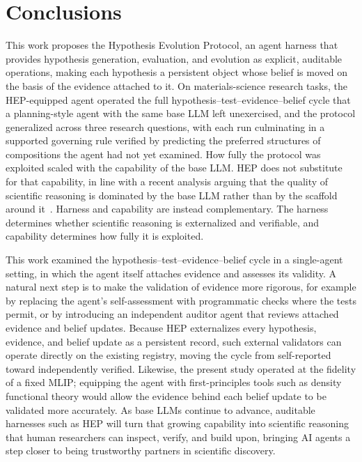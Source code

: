 \section{Conclusions}

This work proposes the Hypothesis Evolution Protocol, an agent harness
that provides hypothesis generation, evaluation, and evolution as
explicit, auditable operations, making each hypothesis a persistent
object whose belief is moved on the basis of the evidence attached to
it.
On materials-science research tasks, the HEP-equipped agent operated
the full hypothesis--test--evidence--belief cycle that a planning-style
agent with the same base LLM left unexercised, and the protocol
generalized across three research questions, with each run culminating
in a supported governing rule verified by predicting the preferred
structures of compositions the agent had not yet examined.
How fully the protocol was exploited scaled with the capability of the
base LLM.
HEP does not substitute for that capability, in line with a
recent analysis arguing that the quality of scientific reasoning is
dominated by the base LLM rather than by the scaffold around
it~\cite{RiosGarcia2026AIScientists}.
Harness and capability are instead complementary.
The harness determines whether scientific reasoning is externalized
and verifiable, and capability determines how fully it is exploited.

This work examined the hypothesis--test--evidence--belief cycle in a
single-agent setting, in which the agent itself attaches evidence and
assesses its validity.
A natural next step is to make the validation of evidence more
rigorous, for example by replacing the agent's self-assessment with
programmatic checks where the tests permit, or by introducing an
independent auditor agent that reviews attached evidence and belief
updates.
Because HEP externalizes every hypothesis, evidence, and belief update
as a persistent record, such external validators can operate directly
on the existing registry, moving the cycle from self-reported toward
independently verified.
Likewise, the present study operated at the fidelity of a fixed MLIP;
equipping the agent with first-principles tools such as density
functional theory would allow the evidence behind each belief update
to be validated more accurately.
As base LLMs continue to advance, auditable harnesses such as HEP will
turn that growing capability into scientific reasoning that human
researchers can inspect, verify, and build upon, bringing AI agents a
step closer to being trustworthy partners in scientific discovery.
